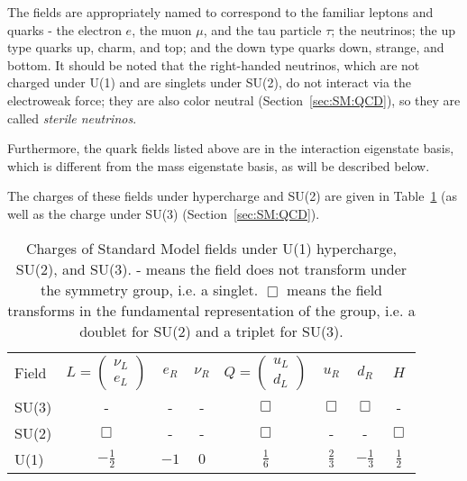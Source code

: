 The fields are appropriately named to correspond to the familiar leptons and quarks - the electron $e$, the muon $\mu$, and the tau particle $\tau$; the neutrinos; the up type quarks up, charm, and top; and the down type quarks down, strange, and bottom.
It should be noted that the right-handed neutrinos, which are not charged under U(1) and are singlets under SU(2), do not interact via the electroweak force; they are also color neutral (Section~\ref{sec:SM:QCD}), so they are called \textit{sterile neutrinos}.

Furthermore, the quark fields listed above are in the interaction eigenstate basis, which is different from the mass eigenstate basis, as will be described below.

The charges of these fields under hypercharge and SU(2) are given in Table~\ref{tab:SM:charges} (as well as the charge under SU(3) (Section~\ref{sec:SM:QCD}).
\begin{table}[]
\centering
\caption{Charges of Standard Model fields under U(1) hypercharge, SU(2), and SU(3). - means the field does not transform under the symmetry group, i.e. a singlet. $\Box$ means the field transforms in the fundamental representation of the group, i.e. a doublet for SU(2) and a triplet for SU(3).}
\label{tab:SM:charges}
\begin{tabular}{l c c c c c c c}
\hline
Field  & $L = \begin{pmatrix}\nu_L\\e_L\end{pmatrix}$  & $e_R$  & $\nu_R$ & $Q = \begin{pmatrix}u_L\\d_L\end{pmatrix}$ & $u_R$ & $d_R$ & $H$ \\
SU(3) & - & - & - & $\Box$ & $\Box$ & $\Box$ & - \\
SU(2) & $\Box$ & - & - & $\Box$ & - & - & $\Box$ \\
U(1)  & $-\frac{1}{2}$ & $-1$ & $0$ & $\frac{1}{6}$ & $\frac{2}{3}$ & $-\frac{1}{3}$ & $\frac{1}{2}$
\end{tabular}
\end{table}

